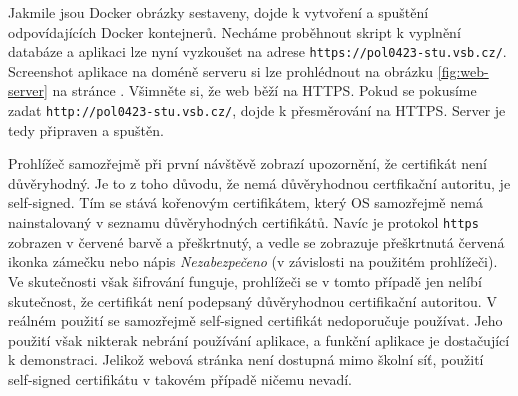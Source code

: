 Jakmile jsou Docker obrázky sestaveny, dojde k vytvoření a spuštění
odpovídajících Docker kontejnerů. Necháme proběhnout skript k vyplnění
databáze a aplikaci lze nyní vyzkoušet na adrese
\texttt{https://pol0423-stu.vsb.cz/}. Screenshot aplikace na doméně
serveru si lze prohlédnout na obrázku \ref{fig:web-server}
na stránce \pageref{fig:web-server}. Všimněte si, že web běží na HTTPS.
Pokud se pokusíme zadat \texttt{http://pol0423-stu.vsb.cz/}, dojde
k přesměrování na HTTPS. Server je tedy připraven a spuštěn.

Prohlížeč samozřejmě při první návštěvě zobrazí upozornění, že certifikát
není důvěryhodný. Je to z toho důvodu, že nemá důvěryhodnou certfikační
autoritu, je self-signed. Tím se stává kořenovým certifikátem, který OS
samozřejmě nemá nainstalovaný v seznamu důvěryhodných certifikátů.
Navíc je protokol \texttt{https} zobrazen v červené barvě a přeškrtnutý,
a vedle se zobrazuje přeškrtnutá červená ikonka zámečku nebo nápis
\emph{Nezabezpečeno} (v závislosti na použitém prohlížeči). Ve skutečnosti
však šifrování funguje, prohlížeči se v tomto případě jen nelíbí skutečnost,
že certifikát není podepsaný důvěryhodnou certifikační autoritou.
V reálném použití se samozřejmě self-signed certifikát nedoporučuje používat.
Jeho použití však nikterak nebrání používání aplikace, a funkční aplikace
je dostačující k demonstraci. Jelikož webová stránka není dostupná mimo
školní síť, použití self-signed certifikátu v takovém případě ničemu nevadí.

\endinput
